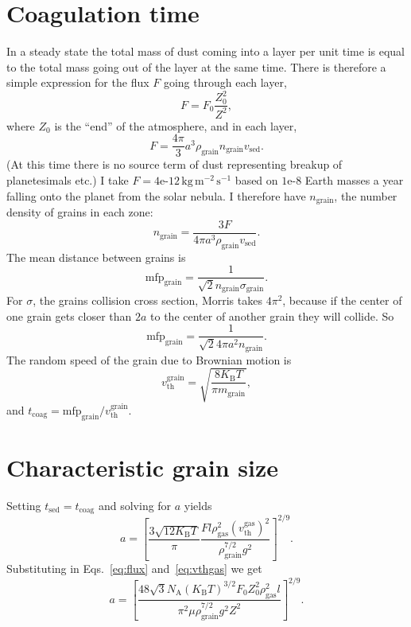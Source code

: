 \documentclass[aps,pra,preprint]{revtex4-2}
\theoremstyle{definition}
\newcommand{\unit}[1]{\,\mathrm{#1}} %
\newcommand{\rom}[1]{\mathrm{#1}} %
\begin{document}
\section*{Coagulation time}
In a steady state the total mass of dust coming into a layer per unit time is
equal to the total mass going out of the layer at the same time. There is
therefore a simple expression for the flux $F$ going through each layer,
\begin{equation}\label{eq:flux}
F=F_0\frac{Z_0^2}{Z^2},
\end{equation}
where $Z_0$ is the ``end'' of the atmosphere, and in each layer,
\begin{equation}
F=\frac{4\pi}{3}a^3\rho_\text{grain}n_\text{grain}v_\text{sed}.
\end{equation}
(At this time there is no source term of dust representing breakup of
planetesimals etc.) I take $F=4\text{e-12}\unit{kg\,m^{-2}\,s^{-1}}$ based on
$1\text{e-8}$ Earth masses a year falling onto the planet from the solar
nebula. I therefore have $n_\text{grain}$, the number density of grains in each
zone:
\begin{equation}
n_\text{grain}=\frac{3F}{4\pi{a}^3\rho_\text{grain}v_\text{sed}}.
\end{equation}
The mean distance between grains is
\begin{equation}
\text{mfp}_\text{grain}=\frac{1}{\sqrt{2}n_\text{grain}\sigma_\text{grain}}.
\end{equation}
For $\sigma$, the grains collision cross section, Morris takes $4\pi^2$,
because if the center of one grain gets closer than $2a$ to the center of
another grain they will collide. So
\begin{equation}
\text{mfp}_\text{grain}=\frac{1}{\sqrt{2}4\pi{a}^2n_\text{grain}}.
\end{equation}
The random speed of the grain due to Brownian motion is
\begin{equation}
v_\text{th}^\text{grain}=\sqrt{\frac{8K_\rom{B}T}{\pi{m}_\text{grain}}},
\end{equation}
and $t_\text{coag}=\text{mfp}_\text{grain}/v_\text{th}^\text{grain}$.

\section*{Characteristic grain size}
Setting $t_\text{sed}=t_\text{coag}$ and solving for $a$ yields
\begin{equation}
a = \left[\frac{3\sqrt{12K_\rom{B}T}}{\pi}
\frac{Fl\rho_\text{gas}^2(v_\text{th}^\text{gas})^2}
{\rho_\text{grain}^{7/2}g^2}
\right]^{2/9}.
\end{equation}
Substituting in Eqs.~\eqref{eq:flux} and~\eqref{eq:vthgas} we get
\begin{equation}
a = \left[
\frac{48\sqrt{3}N_\rom{A}(K_\rom{B}T)^{3/2}F_0Z_0^2\rho_\text{gas}^2l}
{\pi^2\mu\rho_\text{grain}^{7/2}g^2Z^2}
\right]^{2/9}.
\end{equation}
\end{document}
